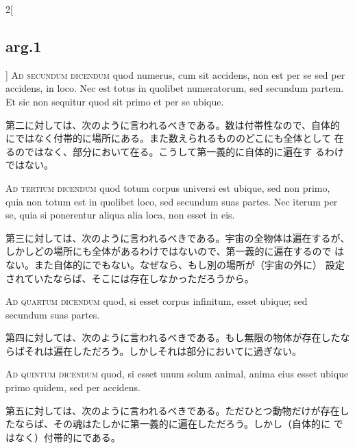 \documentclass[paper=a4paper,fontsize=10pt,jafontsize=9pt,titlepage]{jlreq}
\begin{document}
\begin{paracol}{2}[\subsection{arg.1}]
{\scshape Ad secundum dicendum} quod numerus, cum sit accidens, non est per se
 sed per accidens, in loco. Nec est totus in quolibet numeratorum, sed
 secundum partem. Et sic non sequitur quod sit primo et per se ubique.

\switchcolumn

第二に対しては、次のように言われるべきである。数は付帯性なので、自体的
 にではなく付帯的に場所にある。また数えられるもののどこにも全体として
 在るのではなく、部分において在る。こうして第一義的に自体的に遍在す
 るわけではない。

\switchcolumn*[\subsection{ad.3}]

{\scshape Ad tertium dicendum} quod totum corpus universi est ubique, sed non
 primo, quia non totum est in quolibet loco, sed secundum suas
 partes. Nec iterum per se, quia si ponerentur aliqua alia loca, non
 esset in eis.

\switchcolumn

第三に対しては、次のように言われるべきである。宇宙の全物体は遍在するが、
 しかしどの場所にも全体があるわけではないので、第一義的に遍在するので
 はない。また自体的にでもない。なぜなら、もし別の場所が（宇宙の外に）
 設定されていたならば、そこには存在しなかっただろうから。

\switchcolumn*[\subsection{ad.4}]

{\scshape Ad quartum dicendum} quod, si esset corpus infinitum, esset ubique;
 sed secundum suas partes.

\switchcolumn

第四に対しては、次のように言われるべきである。もし無限の物体が存在したな
 らばそれは遍在しただろう。しかしそれは部分においてに過ぎない。

\switchcolumn*[\subsection{ad.5}]

{\scshape Ad quintum dicendum} quod, si esset unum solum animal, anima eius
 esset ubique primo quidem, sed per accidens.

\switchcolumn

第五に対しては、次のように言われるべきである。ただひとつ動物だけが存在し
 たならば、その魂はたしかに第一義的に遍在しただろう。しかし（自体的に
 ではなく）付帯的にである。


\end{paracol}
\end{document}
